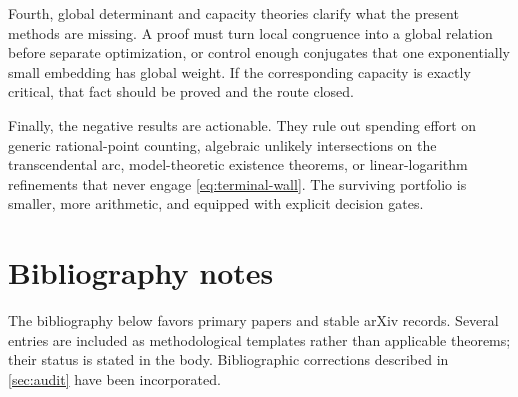\documentclass[10pt,letterpaper]{article}
\begin{document}
Fourth, global determinant and capacity theories clarify what the present methods are
missing.  A proof must turn local congruence into a global relation before separate
optimization, or control enough conjugates that one exponentially small embedding has global
weight.  If the corresponding capacity is exactly critical, that fact should be proved and
the route closed.

Finally, the negative results are actionable.  They rule out spending effort on generic
rational-point counting, algebraic unlikely intersections on the transcendental arc,
model-theoretic existence theorems, or linear-logarithm refinements that never engage
\cref{eq:terminal-wall}.  The surviving portfolio is smaller, more arithmetic, and equipped
with explicit decision gates.

\clearpage
\appendix
\section{Bibliography notes}

The bibliography below favors primary papers and stable arXiv records.  Several entries are
included as methodological templates rather than applicable theorems; their status is stated
in the body.  Bibliographic corrections described in \cref{sec:audit} have been incorporated.
\end{document}
